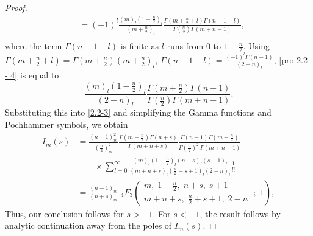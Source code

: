 \documentclass{article}
\theoremstyle{boldremark}
\renewcommand\[{\begin{equation}}
\renewcommand\]{\end{equation}}
\theoremstyle{definition}
\numberwithin{equation}{section}
\begin{document}
\begin{proof}
\begin{align}
    &= (-1)^l \frac{(m)_l \left(1 - \frac{n}{2}\right)_l}{\left(m + \frac{n}{2}\right)_l} \frac{\Gamma\left(m + \frac{n}{2} + l\right) \Gamma(n - 1 - l)}{\Gamma\left(\frac{n}{2}\right) \Gamma(m + n - 1)}, \nonumber \\
\end{align}
where the term $\Gamma(n-1-l)$ is finite as $l$ runs from $0$ to $1-\frac{n}{2}$.
Using $\Gamma(m + \frac{n}{2} + l) = \Gamma(m+\frac{n}{2})(m + \frac{n}{2})_l$, $\Gamma(n - 1 - l) = \frac{(-1)^l \Gamma(n - 1)}{(2 - n)_l}$, \eqref{pro 2.2 - 4} is equal to
\begin{equation}\label{pro 2.2 - 5}
    \frac{(m)_l \left(1 - \frac{n}{2}\right)_l}{(2-n)_l} \frac{\Gamma\left(m + \frac{n}{2} \right) \Gamma(n - 1)}{\Gamma\left(\frac{n}{2}\right) \Gamma(m + n - 1)}.
\end{equation}
Substituting this into \eqref{2.2-3} and simplifying the Gamma functions and Pochhammer symbols, we obtain
\begin{align}
    I_m(s) &= \frac{(n-1)_m^2}{\left(\frac{n}{2}\right)_m^2}\frac{\Gamma\left(m+\frac{n}{2}\right) \Gamma(n+s)}{\Gamma(m+n+s)} \frac{\Gamma(n-1)\Gamma\left(m+\frac{n}{2}\right)}{\Gamma\left(\frac{n}{2}\right)^2\,\Gamma(m+n-1)}\nonumber \\
    &\quad \quad \times \sum_{l=0}^{\infty} \frac{(m)_l \left(1 - \frac{n}{2}\right)_l (n+s)_l (s+1)_l}{(m + n + s)_l \left(\frac{n}{2} + s + 1\right)_l (2 - n)_l} \frac{1}{l!} \nonumber \\
    &= \frac{(n-1)_m}{(n+s)_m} \; {}_4F_3 \left( \begin{matrix} m,\; 1 - \frac{n}{2},\; n+s,\; s+1 \\[4pt] m + n + s,\; \frac{n}{2} + s + 1,\; 2-n \end{matrix} \;;\; 1 \right),
\end{align}
Thus, our conclusion follows for \(s>-1\).
For \(s<-1\), the result follows by analytic continuation away from the poles of \(I_m(s)\).
\end{proof}
\end{document}
